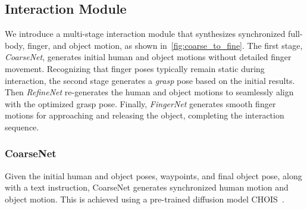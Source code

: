 \subsection{Interaction Module}
\label{sec:low_level_interaction}
We introduce a multi-stage interaction module that synthesizes synchronized full-body, finger, and object motion, as shown in~\cref{fig:coarse_to_fine}.
The first stage, \textit{CoarseNet}, generates initial human and object motions without detailed finger movement.
Recognizing that finger poses typically remain static during interaction, the second stage generates a \textit{grasp} pose based on the initial results.
Then \textit{RefineNet} re-generates the human and object motions to seamlessly align with the optimized grasp pose.
Finally, \textit{FingerNet} generates smooth finger motions for approaching and releasing the object, completing the interaction sequence.

\subsubsection{CoarseNet}
\label{sec:coarse_net}
Given the initial human and object poses, waypoints, and final object pose, along with a text instruction, CoarseNet generates synchronized human motion and object motion. This is achieved using a pre-trained diffusion model CHOIS~\cite{li2023controllable}.




